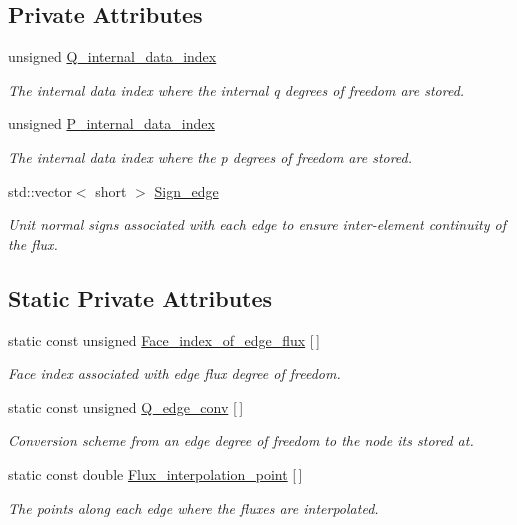 \subsection*{Private Attributes}
\begin{DoxyCompactItemize}
\item 
unsigned \hyperlink{classoomph_1_1TRaviartThomasDarcyElement_aebbd8a5f91a023e462a3847340e56557}{Q\+\_\+internal\+\_\+data\+\_\+index}
\begin{DoxyCompactList}\small\item\em The internal data index where the internal q degrees of freedom are stored. \end{DoxyCompactList}\item 
unsigned \hyperlink{classoomph_1_1TRaviartThomasDarcyElement_ab4d0dfd16c5bbeb12c9420e2d137e1f2}{P\+\_\+internal\+\_\+data\+\_\+index}
\begin{DoxyCompactList}\small\item\em The internal data index where the p degrees of freedom are stored. \end{DoxyCompactList}\item 
std\+::vector$<$ short $>$ \hyperlink{classoomph_1_1TRaviartThomasDarcyElement_a8e3b4b2a4d840e22669bc3390843574a}{Sign\+\_\+edge}
\begin{DoxyCompactList}\small\item\em Unit normal signs associated with each edge to ensure inter-\/element continuity of the flux. \end{DoxyCompactList}\end{DoxyCompactItemize}
\subsection*{Static Private Attributes}
\begin{DoxyCompactItemize}
\item 
static const unsigned \hyperlink{classoomph_1_1TRaviartThomasDarcyElement_a89a31c8a5261b1bca700707147d8a143}{Face\+\_\+index\+\_\+of\+\_\+edge\+\_\+flux} \mbox{[}$\,$\mbox{]}
\begin{DoxyCompactList}\small\item\em Face index associated with edge flux degree of freedom. \end{DoxyCompactList}\item 
static const unsigned \hyperlink{classoomph_1_1TRaviartThomasDarcyElement_a7567cd27a9ce08a2a820510dcab2ac20}{Q\+\_\+edge\+\_\+conv} \mbox{[}$\,$\mbox{]}
\begin{DoxyCompactList}\small\item\em Conversion scheme from an edge degree of freedom to the node it\textquotesingle{}s stored at. \end{DoxyCompactList}\item 
static const double \hyperlink{classoomph_1_1TRaviartThomasDarcyElement_aa8ccb00e2e8aa63690226fad93b7b1e8}{Flux\+\_\+interpolation\+\_\+point} \mbox{[}$\,$\mbox{]}
\begin{DoxyCompactList}\small\item\em The points along each edge where the fluxes are interpolated. \end{DoxyCompactList}\end{DoxyCompactItemize}
